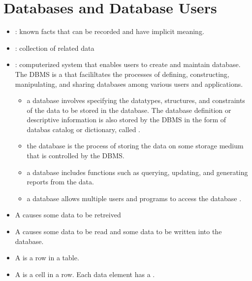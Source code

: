 \chapter{Databases and Database Users}


    \begin{itemize}
      \item {}: known facts that can be recorded and have implicit
        meaning.
      \item {}: collection of related data 
      \item {}: computerized system that
        enables users to create and maintain database. The DBMS is a
         that facililtates the processes of
        defining, constructing, manipulating, and sharing databases among various
        users and applications.
        \begin{itemize}
          \item {} a database involves specifying the datatypes,
            structures, and constraints of the data to be stored in the database.
            The database definition or descriptive information is also stored by
            the DBMS in the form of databas catalog or dictionary, called
            .
          \item {} the database is the process of storing the data
            on some storage medium that is controlled by the DBMS.
          \item {} a database includes functions such as querying,
            updating, and generating reports from the data.
          \item {} a database allows multiple users and programs to
            access the database .
        \end{itemize}
      \item A  causes some data to be retreived
      \item A  causes some data to be read and some data to be
        written into the database.
      \item A  is a row in a table.
      \item A  is a cell in a row. Each data element has a
        .
    \end{itemize}

